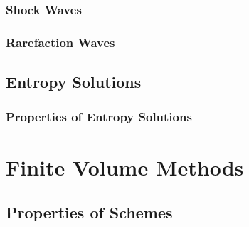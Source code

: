 \documentclass[
  fourColumns,
  landscape
]{formularyETH/formularyETH}
\begin{document}
    \subsubsection{Shock Waves}\label{subsubsec:shock_waves}
    
    \subsubsection{Rarefaction Waves}\label{subsubsec:rarefaction_waves}
    \label{subsubsec:lax-oleinik_entropy_condition}
      
      
      
  \subsection{Entropy Solutions}\label{subsec:entropy_solutions}
        
      \subsubsection{Properties of Entropy Solutions}\label{subsubsec:properties_of_entropy_solutions}
        
        \label{subsubsubsec:$l^p$-bound_on_entropy_solutions}
        
  \label{subsec:maximum_principle}
        
        


\newpage
\section{Finite Volume Methods}\label{subsec:entropy_solutions}
  
  \subsection{Properties of Schemes}\label{subsec:properties_of_schemes}
    
\end{document}
